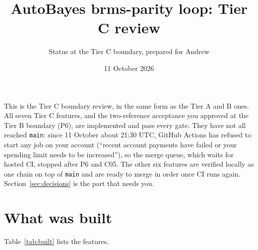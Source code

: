 \documentclass[11pt]{article}
\title{AutoBayes brms-parity loop: Tier C review}
\author{Status at the Tier C boundary, prepared for Andrew}
\date{11 October 2026}
\newcommand{\code}[1]{\texttt{#1}}
\begin{document}
\maketitle

\noindent This is the Tier C boundary review, in the same form as the Tier A and B ones. All seven Tier C features,
and the two-reference acceptance you approved at the Tier B boundary (P6), are implemented and pass every gate. They
have not all reached \code{main}: since 11 October about 21:30 UTC, GitHub Actions has refused to start any job on
your account (``recent account payments have failed or your spending limit needs to be increased''), so the merge
queue, which waits for hosted CI, stopped after P6 and C05. The other six features are verified locally as one chain on
top of \code{main} and are ready to merge in order once CI runs again. Section~\ref{sec:decisions} is the part that
needs you.

\section{What was built}
\label{sec:built}

Table~\ref{tab:built} lists the features.
\end{document}
